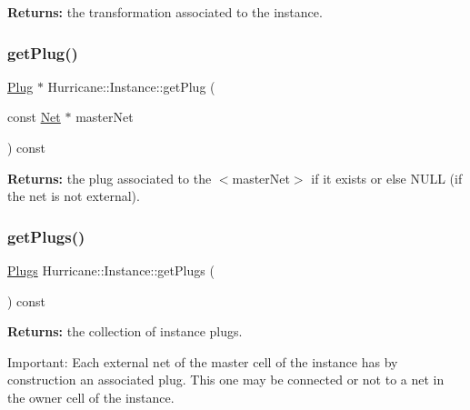{\bfseries Returns\+:} the transformation associated to the instance. \mbox{\label{classHurricane_1_1Instance_a1afe07edc0374ddfb505b4973c902834}} 
\subsubsection{\texorpdfstring{get\+Plug()}{getPlug()}}
{\footnotesize\ttfamily \mbox{\hyperlink{classHurricane_1_1Plug}{Plug}} $\ast$ Hurricane\+::\+Instance\+::get\+Plug (\begin{DoxyParamCaption}\item[{const \mbox{\hyperlink{classHurricane_1_1Net}{Net}} $\ast$}]{master\+Net }\end{DoxyParamCaption}) const\hspace{0.3cm}{\ttfamily [inline]}}

{\bfseries Returns\+:} the plug associated to the {\ttfamily $<$master\+Net$>$} if it exists or else N\+U\+LL (if the net is not external). \mbox{\label{classHurricane_1_1Instance_a5433b64eed99f9a099004490fae6d8f4}} 
\subsubsection{\texorpdfstring{get\+Plugs()}{getPlugs()}}
{\footnotesize\ttfamily \mbox{\hyperlink{namespaceHurricane_ac8335d2057483ee7a935c15a9460c64f}{Plugs}} Hurricane\+::\+Instance\+::get\+Plugs (\begin{DoxyParamCaption}{ }\end{DoxyParamCaption}) const\hspace{0.3cm}{\ttfamily [inline]}}

{\bfseries Returns\+:} the collection of instance plugs.

\begin{DoxyParagraph}{Important\+: Each external net of the master cell of the instance has by }
construction an associated plug. This one may be connected or not to a net in the owner cell of the instance. 
\end{DoxyParagraph}
\mbox{\label{classHurricane_1_1Instance_a18beeab0def83c20e25a710b30dd8ca9}} 
